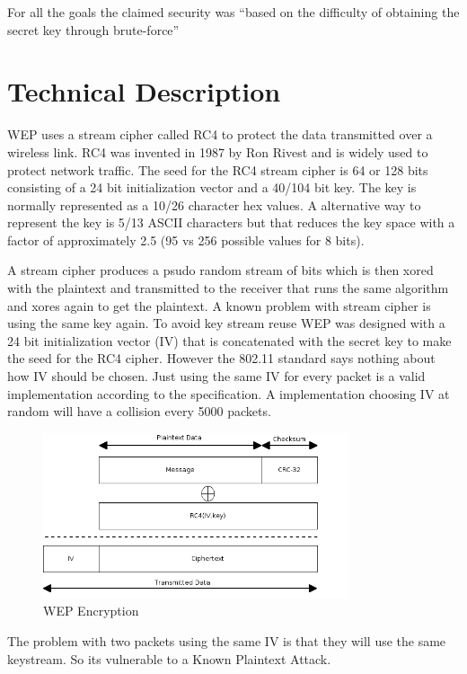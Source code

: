 \documentclass[twocolumn,11pt]{IEEEtran}
\begin{document}
For all the goals the claimed security was ``based on the difficulty of obtaining the secret key through brute-force'' \cite{IEEE:Fast}



\section {Technical Description}
\label{sec:technical_description}

WEP uses a stream cipher called RC4 to protect the data transmitted over a wireless link. RC4 was invented in 1987 by Ron Rivest and is widely used to protect network traffic. The seed for the RC4 stream cipher is 64 or 128 bits consisting of a 24 bit initialization vector and a 40/104 bit key. The key is normally represented as a 10/26 character hex values. A alternative way to represent the key is 5/13 ASCII characters but that reduces the key space with a factor of approximately 2.5 (95 vs 256 possible values for 8 bits).

A stream cipher produces a psudo random stream of bits which is then xored with the plaintext and transmitted to the receiver that runs the same algorithm and xores again to get the plaintext. A known problem with stream cipher is using the same key again. To avoid key stream reuse WEP was designed with a 24 bit initialization vector (IV) that is concatenated with the secret key to make the seed for the RC4 cipher. However the 802.11 standard says nothing about how IV should be chosen. Just using the same IV for every packet is a valid implementation according to the specification. A implementation choosing IV at random will have a collision every 5000 packets\cite{Borisov:New}. 

\begin{figure}
\includegraphics[width=90mm]{WEP_Encryption.png}
\caption{WEP Encryption}
\end{figure}

The problem with two packets using the same IV is that they will use the same keystream. So its vulnerable to a Known Plaintext Attack.
\end{document}

